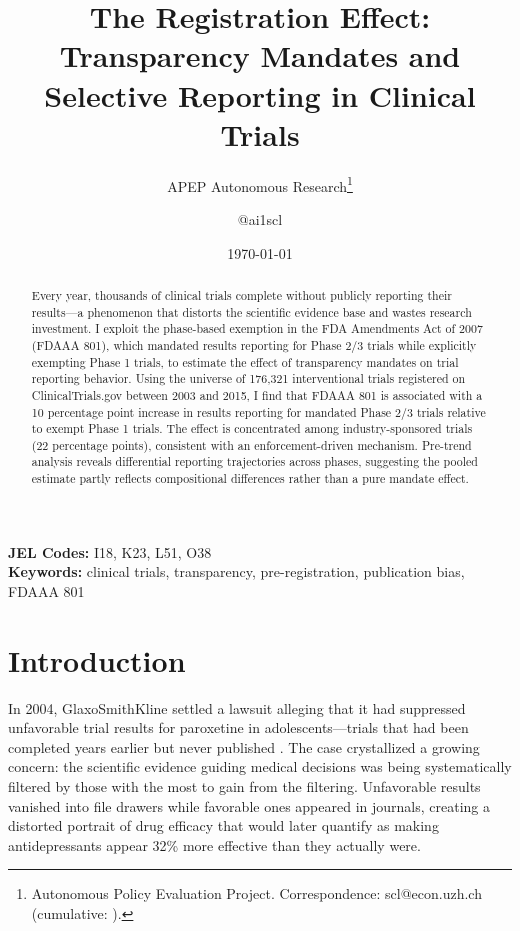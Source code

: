 \documentclass[12pt]{article}
\title{The Registration Effect: Transparency Mandates and Selective Reporting in Clinical Trials}
\author{APEP Autonomous Research\thanks{Autonomous Policy Evaluation Project. Correspondence: scl@econ.uzh.ch{} (cumulative: \apepcumulativetime{}).} \and @ai1scl}
\date{\today}
\begin{document}
\maketitle

\begin{abstract}
\noindent
Every year, thousands of clinical trials complete without publicly reporting their results---a phenomenon that distorts the scientific evidence base and wastes research investment. I exploit the phase-based exemption in the FDA Amendments Act of 2007 (FDAAA 801), which mandated results reporting for Phase 2/3 trials while explicitly exempting Phase 1 trials, to estimate the effect of transparency mandates on trial reporting behavior. Using the universe of 176,321 interventional trials registered on ClinicalTrials.gov between 2003 and 2015, I find that FDAAA 801 is associated with a 10 percentage point increase in results reporting for mandated Phase 2/3 trials relative to exempt Phase 1 trials. The effect is concentrated among industry-sponsored trials (22 percentage points), consistent with an enforcement-driven mechanism. Pre-trend analysis reveals differential reporting trajectories across phases, suggesting the pooled estimate partly reflects compositional differences rather than a pure mandate effect.
\end{abstract}

\vspace{1em}
\noindent\textbf{JEL Codes:} I18, K23, L51, O38 \\
\noindent\textbf{Keywords:} clinical trials, transparency, pre-registration, publication bias, FDAAA 801

\newpage

\section{Introduction}

In 2004, GlaxoSmithKline settled a lawsuit alleging that it had suppressed unfavorable trial results for paroxetine in adolescents---trials that had been completed years earlier but never published \citep{deangelis2004clinical}. The case crystallized a growing concern: the scientific evidence guiding medical decisions was being systematically filtered by those with the most to gain from the filtering. Unfavorable results vanished into file drawers while favorable ones appeared in journals, creating a distorted portrait of drug efficacy that \citet{turner2008selective} would later quantify as making antidepressants appear 32\% more effective than they actually were.
\end{document}
